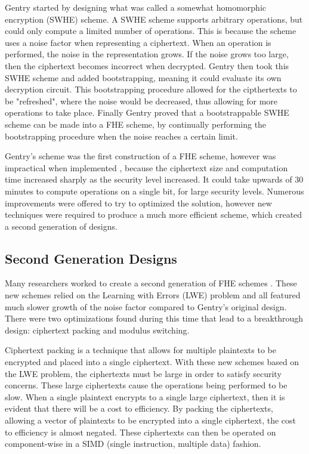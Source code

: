 Gentry started by designing what was called a somewhat homomorphic encryption (SWHE) scheme. A SWHE scheme supports arbitrary operations, but could only compute a limited number of operations. This is because the scheme uses a noise factor when representing a ciphertext. When an operation is performed, the noise in the representation grows. If the noise grows too large, then the ciphertext becomes incorrect when decrypted. Gentry then took this SWHE scheme and added bootstrapping, meaning it could evaluate its own decryption circuit. This bootstrapping procedure allowed for the cipthertexts to be "refreshed", where the noise would be decreased, thus allowing for more operations to take place. Finally Gentry proved that a bootstrappable SWHE scheme can be made into a FHE scheme, by continually performing the bootstrapping procedure when the noise reaches a certain limit.

Gentry's scheme was the first construction of a FHE scheme, however was impractical when implemented \cite{cryptoeprint:2010:520}, because the ciphertext size and computation time increased sharply as the security level increased. It could take upwards of 30 minutes to compute operations on a single bit, for large security levels. Numerous improvements \cite{cryptoeprint:2010:299} \cite{smart2010fully} \cite{cryptoeprint:2011:133} \cite{cryptoeprint:2011:279} were offered to try to optimized the solution, however new techniques were required to produce a much more efficient scheme, which created a second generation of designs.

\subsection{Second Generation Designs}
Many researchers worked to create a second generation of FHE schemes \cite{cryptoeprint:2011:344} \cite{cryptoeprint:2012:078} \cite{cryptoeprint:2013:094} \cite{cryptoeprint:2013:340}. These new schemes relied on the Learning with Errors (LWE) problem and all featured much slower growth of the noise factor compared to Gentry's original design. There were two optimizations found during this time that lead to a breakthrough design: ciphertext packing and modulus switching. 

Ciphertext packing \cite{brakerski2013packed} is a technique that allows for multiple plaintexts to be encrypted and placed into a single ciphertext. With these new schemes based on the LWE problem, the ciphertexts must be large in order to satisfy security concerns. These large ciphertexts cause the operations being performed to be slow. When a single plaintext encrypts to a single large ciphertext, then it is evident that there will be a cost to efficiency. By packing the ciphertexts, allowing a vector of plaintexts to be encrypted into a single ciphertext, the cost to efficiency is almost negated. These ciphertexts can then be operated on component-wise in a SIMD (single instruction, multiple data) fashion. 

